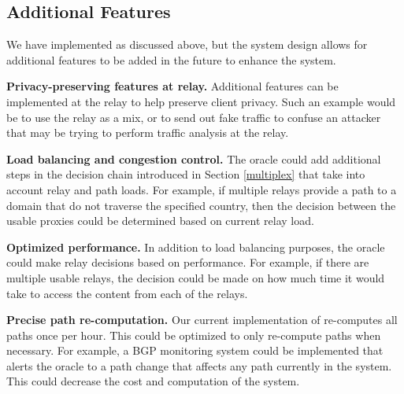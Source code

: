 \subsection{Additional Features}
We have implemented \system{} as discussed above, but the system design allows for 
additional features to be added in the future to enhance the system.

{\bf Privacy-preserving features at relay.}  Additional features can be 
implemented at the relay to help preserve client privacy.  Such an example would 
be to use the relay as a mix, or to send out fake traffic to confuse an 
attacker that may be trying to perform traffic analysis at the relay.

{\bf Load balancing and congestion control.} The oracle could add additional 
steps in the decision chain introduced in Section \ref{multiplex} that take 
into account relay and path loads.  For example, if multiple relays provide 
a path to a domain that do not traverse the specified country, then the 
decision between the usable proxies could be determined based on current relay 
load.

{\bf Optimized performance.} In addition to load balancing purposes, the oracle 
could make relay decisions based on performance.  For example, if there are 
multiple usable relays, the decision could be made on how much time it would 
take to access the content from each of the relays.

{\bf Precise path re-computation.}  Our current implementation of \system{} 
re-computes all paths once per hour.  This could be optimized to only re-compute 
paths when necessary.  For example, a BGP monitoring system could be implemented 
that alerts the oracle to a path change that affects any path currently in 
the system.  This could decrease the cost and computation of the system.
